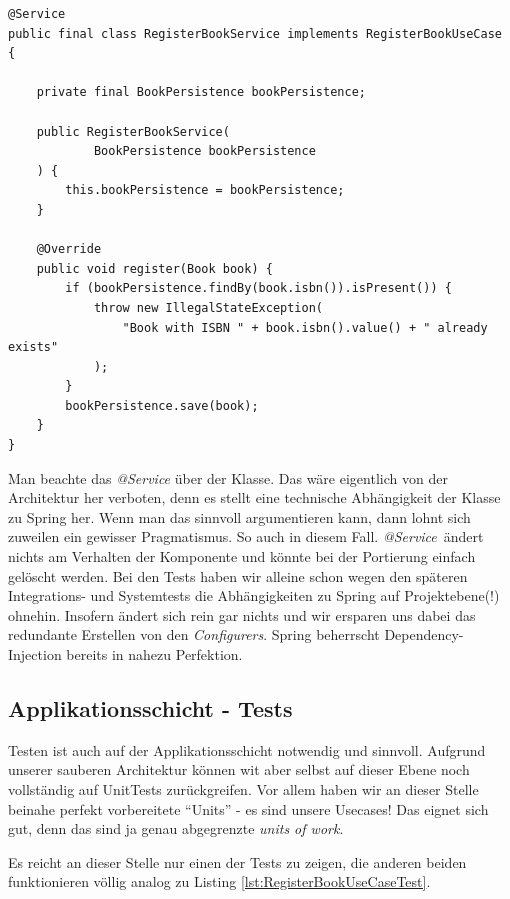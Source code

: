 \begin{listing}[H]
\begin{verbatim}
@Service
public final class RegisterBookService implements RegisterBookUseCase {

    private final BookPersistence bookPersistence;

    public RegisterBookService(
            BookPersistence bookPersistence
    ) {
        this.bookPersistence = bookPersistence;
    }

    @Override
    public void register(Book book) {
        if (bookPersistence.findBy(book.isbn()).isPresent()) {
            throw new IllegalStateException(
                "Book with ISBN " + book.isbn().value() + " already exists"
            );
        }
        bookPersistence.save(book);
    }
}
\end{verbatim}
\caption{Implementierung des RegisterBook Usecase}
\label{lst:RegisterBookService}
\end{listing}

Man beachte das \textit{@Service} über der Klasse. Das wäre eigentlich von der
Architektur her verboten, denn es stellt eine technische Abhängigkeit der
Klasse zu Spring her. Wenn man das sinnvoll argumentieren kann, dann lohnt
sich zuweilen ein gewisser Pragmatismus. So auch in diesem Fall. 
\textit{@Service}\ ändert nichts am Verhalten der Komponente und könnte bei der
Portierung einfach gelöscht werden. Bei den Tests haben wir alleine schon 
wegen den späteren Integrations- und Systemtests die Abhängigkeiten zu Spring
auf Projektebene(!) ohnehin. Insofern ändert sich rein gar nichts und wir 
ersparen uns dabei das redundante Erstellen von den \textit{Configurers}.
Spring beherrscht Dependency-Injection bereits in nahezu Perfektion.

\subsection{Applikationsschicht - Tests}
Testen ist auch auf der Applikationsschicht notwendig und sinnvoll. Aufgrund
unserer sauberen Architektur können wit aber selbst auf dieser Ebene noch
vollständig auf UnitTests zurückgreifen. Vor allem haben wir an dieser Stelle
beinahe perfekt vorbereitete ``Units'' - es sind unsere Usecases! Das eignet
sich gut, denn das sind ja genau abgegrenzte \textit{units of work}.

Es reicht an dieser Stelle nur einen der Tests zu zeigen, die anderen beiden
funktionieren völlig analog zu Listing \ref{lst:RegisterBookUseCaseTest}.

